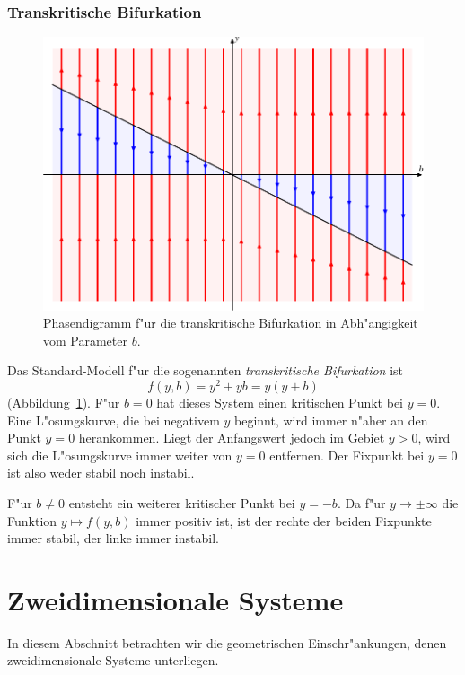 \subsubsection{Transkritische Bifurkation}
\begin{figure}
\centering
\includegraphics{chapters/images/bifurkation-3.pdf}
\caption{Phasendigramm f"ur die transkritische Bifurkation in Abh"angigkeit
vom Parameter $b$.
\label{geometrie:transkritisch}}
\end{figure}
Das Standard-Modell f"ur die sogenannten {\em transkritische Bifurkation} ist 
\[
f(y,b)=y^2+yb = y(y+b)
\]
(Abbildung~\ref{geometrie:transkritisch}).
F"ur $b=0$ hat dieses System einen kritischen Punkt bei $y=0$.
Eine L"osungskurve, die bei negativem $y$ beginnt, wird immer n"aher
an den Punkt $y=0$ herankommen.
Liegt der Anfangswert jedoch im Gebiet $y>0$, wird sich die L"osungskurve
immer weiter von $y=0$ entfernen.
Der Fixpunkt bei $y=0$ ist also weder stabil noch instabil.

F"ur $b\ne 0$ entsteht ein weiterer kritischer Punkt bei $y=-b$.
Da f"ur $y\to\pm\infty$ die Funktion $y\mapsto f(y,b)$ immer positiv
ist, ist der rechte der beiden Fixpunkte immer stabil, der
linke immer instabil.


%
%
\section{Zweidimensionale Systeme}
In diesem Abschnitt betrachten wir die geometrischen Einschr"ankungen, denen
zweidimensionale Systeme unterliegen.

%
%
